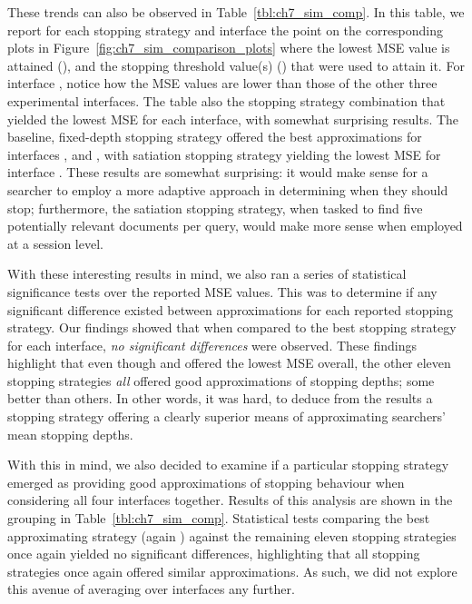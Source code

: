 These trends can also be observed in Table~\ref{tbl:ch7_sim_comp}. In this table, we report for each stopping strategy and interface the point on the corresponding plots in Figure~\ref{fig:ch7_sim_comparison_plots} where the lowest MSE value is attained (), and the stopping threshold value(s) () that were used to attain it. For interface , notice how the MSE values are lower than those of the other three experimental interfaces. The table also  the stopping strategy combination that yielded the lowest MSE for each interface, with somewhat surprising results. The baseline, fixed-depth stopping strategy  offered the best approximations for interfaces ,  and , with satiation stopping strategy  yielding the lowest MSE for interface . These results are somewhat surprising: it would make sense for a searcher to employ a more adaptive approach in determining when they should stop; furthermore, the satiation stopping strategy, when tasked to find five potentially relevant documents per query, would make more sense when employed at a session level.

With these interesting results in mind, we also ran a series of statistical significance tests over the reported MSE values. This was to determine if any significant difference existed between approximations for each reported stopping strategy. Our findings showed that when compared to the best stopping strategy for each interface, \emph{no significant differences} were observed. These findings highlight that even though  and  offered the lowest MSE overall, the other eleven stopping strategies \emph{all} offered good approximations of stopping depths; some better than others. In other words, it was hard, to deduce from the results a stopping strategy offering a clearly superior means of approximating searchers' mean stopping depths.

With this in mind, we also decided to examine if a particular stopping strategy emerged as providing good approximations of stopping behaviour when considering all four interfaces together. Results of this analysis are shown in the  grouping in Table~\ref{tbl:ch7_sim_comp}. Statistical tests comparing the best approximating strategy (again ) against the remaining eleven stopping strategies once again yielded no significant differences, highlighting that all stopping strategies once again offered similar approximations. As such, we did not explore this avenue of averaging over interfaces any further.

